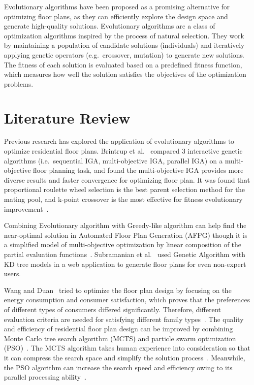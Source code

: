 \documentclass[]{article}
\begin{document}
Evolutionary algorithms have been proposed as a promising alternative for optimizing floor plans, as they can efficiently explore the design space and generate high-quality solutions. Evolutionary algorithms are a class of optimization algorithms inspired by the process of natural selection. They work by maintaining a population of candidate solutions (individuals) and iteratively applying genetic operators (e.g.\ crossover, mutation) to generate new solutions. The fitness of each solution is evaluated based on a predefined fitness function, which measures how well the solution satisfies the objectives of the optimization problems.

\section{Literature Review}
Previous research has explored the application of evolutionary algorithms to optimize residential floor plans. Brintrup et al.~\cite{10.1007/11732242_56} compared 3 interactive genetic algorithms (i.e.\ sequential IGA, multi-objective IGA, parallel IGA) on a multi-objective floor planning task, and found the multi-objective IGA provides more diverse results and faster convergence for optimizing floor plan. It was found that proportional roulette wheel selection is the best parent selection method for the mating pool, and k-point crossover is the most effective for fitness evolutionary improvement~\cite{7844659}.

Combining Evolutionary algorithm with Greedy-like algorithm can help find the near-optimal solution in Automated Floor Plan Generation (AFPG) though it is a simplified model of multi-objective optimization by linear composition of the partial evaluation functions~\cite{doi:10.1177/1478077119832982}. Subramanian et al.~\cite{9675541} used Genetic Algorithm with KD tree models in a web application to generate floor plans for even non-expert users.

Wang and Duan~\cite{WANG2023100238} tried to optimize the floor plan design by focusing on the energy consumption and consumer satisfaction, which proves that the preferences of different types of consumers differed significantly. Therefore, different evaluation criteria are needed for satisfying different family types~\cite{WANG2023100238}. The quality and efficiency of residential floor plan design can be improved by combining Monte Carlo tree search algorithm (MCTS) and particle swarm optimization (PSO)~\cite{YAN2024110546}. The MCTS algorithm takes human experience into consideration so that it can compress the search space and simplify the solution process~\cite{YAN2024110546}. Meanwhile, the PSO algorithm can increase the search speed and efficiency owing to its parallel processing ability~\cite{YAN2024110546}.
\end{document}
